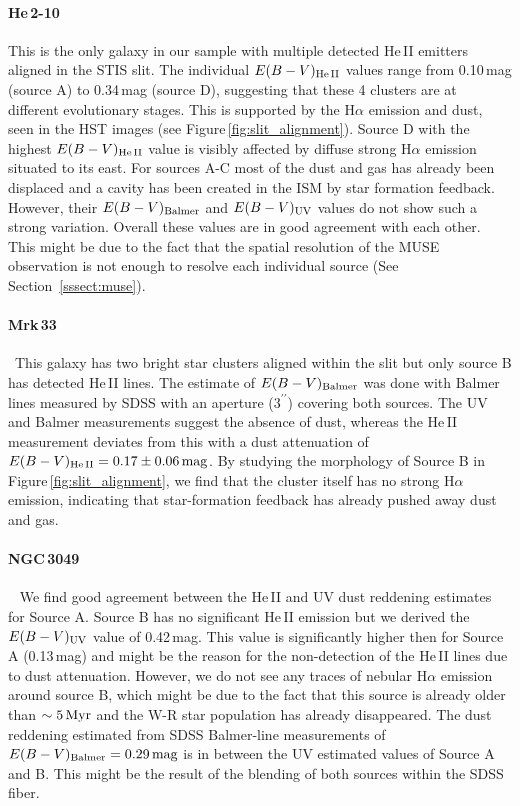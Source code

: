 \documentclass[linenumbers]{aastex63}
\begin{document}
\paragraph{He\,2-10~}
This is the only galaxy in our sample with multiple detected He\,II emitters aligned in the STIS slit. The individual ${E(B-V)_{\rm He\,II}}$ values range from 0.10\,mag (source A) to 0.34\,mag (source D), suggesting that these 4 clusters are at different evolutionary stages. This is supported by the H$\alpha$ emission and dust, seen in the HST images (see Figure\,\ref{fig:slit_alignment}). Source D with the highest ${E(B-V)_{\rm He\,II}}$ value is visibly affected by diffuse strong H$\alpha$ emission situated to its east. For sources A-C most of the dust and gas has already been displaced and a cavity has been created in the ISM by star formation feedback. However, their ${E(B-V)_{\rm Balmer}}$ and ${E(B-V)_{\rm UV}}$ values do not show such a strong variation. Overall these values are in good agreement with each other. This might be due to the fact that the spatial resolution of the MUSE observation is not enough to resolve each individual source (See Section~\ref{sssect:muse}).


\paragraph{Mrk\,33~}~This galaxy has two bright star clusters aligned within the slit but only source B has detected He\,II lines. The estimate of ${E(B-V)_{\rm Balmer}}$ was done with Balmer lines measured by SDSS with an aperture ($3^{\prime\prime}$) covering both sources. The UV and Balmer measurements suggest the absence of dust, whereas the He\,II measurement deviates from this with a dust attenuation of $E(B-V)_{\rm He\,II} = 0.17\pm0.06\,{\rm mag}$. By studying the morphology of Source B in Figure\,\ref{fig:slit_alignment}, we find that the cluster itself has no strong H$\alpha$ emission, indicating that star-formation feedback has already pushed away dust and gas. 

\paragraph{NGC\,3049~}~
We find good agreement between the He\,II and UV dust reddening estimates for Source A. Source B has no significant He\,II emission but we derived the $E(B-V)_{\rm UV}$ value of 0.42\,mag. This value is significantly higher then for Source A (0.13\,mag) and might be the reason for the non-detection of the He\,II lines due to dust attenuation. However, we do not see any traces of nebular H$\alpha$ emission around source B, which might be due to the fact that this source is already older than $\sim5\,{\rm Myr}$ and the W-R star population has already disappeared.  
The dust reddening estimated from SDSS Balmer-line measurements of $E(B-V)_{\rm Balmer}=0.29\,{\rm mag}$ is in between the UV estimated values of Source A and B. This might be the result of the blending of both sources within the SDSS fiber.
\end{document}
